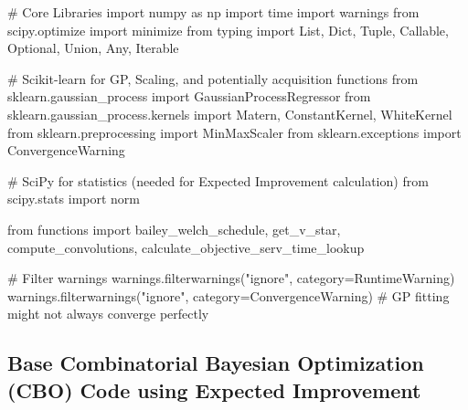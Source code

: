 \documentclass[
  letterpaper,
  DIV=11,
  numbers=noendperiod]{scrartcl}
\newenvironment{Shaded}{\begin{snugshade}}{\end{snugshade}}
\newcommand{\CommentTok}[1]{\textcolor[rgb]{0.37,0.37,0.37}{#1}}
\newcommand{\ImportTok}[1]{\textcolor[rgb]{0.00,0.46,0.62}{#1}}
\newcommand{\NormalTok}[1]{\textcolor[rgb]{0.00,0.23,0.31}{#1}}
\newcommand{\OperatorTok}[1]{\textcolor[rgb]{0.37,0.37,0.37}{#1}}
\newcommand{\PreprocessorTok}[1]{\textcolor[rgb]{0.68,0.00,0.00}{#1}}
\newcommand{\StringTok}[1]{\textcolor[rgb]{0.13,0.47,0.30}{#1}}
\begin{document}
\begin{Shaded}
\begin{Highlighting}[]
\CommentTok{\# Core Libraries}
\ImportTok{import}\NormalTok{ numpy }\ImportTok{as}\NormalTok{ np}
\ImportTok{import}\NormalTok{ time}
\ImportTok{import}\NormalTok{ warnings}
\ImportTok{from}\NormalTok{ scipy.optimize }\ImportTok{import}\NormalTok{ minimize}
\ImportTok{from}\NormalTok{ typing }\ImportTok{import}\NormalTok{ List, Dict, Tuple, Callable, Optional, Union, Any, Iterable}

\CommentTok{\# Scikit{-}learn for GP, Scaling, and potentially acquisition functions}
\ImportTok{from}\NormalTok{ sklearn.gaussian\_process }\ImportTok{import}\NormalTok{ GaussianProcessRegressor}
\ImportTok{from}\NormalTok{ sklearn.gaussian\_process.kernels }\ImportTok{import}\NormalTok{ Matern, ConstantKernel, WhiteKernel}
\ImportTok{from}\NormalTok{ sklearn.preprocessing }\ImportTok{import}\NormalTok{ MinMaxScaler}
\ImportTok{from}\NormalTok{ sklearn.exceptions }\ImportTok{import}\NormalTok{ ConvergenceWarning}

\CommentTok{\# SciPy for statistics (needed for Expected Improvement calculation)}
\ImportTok{from}\NormalTok{ scipy.stats }\ImportTok{import}\NormalTok{ norm}

\ImportTok{from}\NormalTok{ functions }\ImportTok{import}\NormalTok{ bailey\_welch\_schedule, get\_v\_star, compute\_convolutions, calculate\_objective\_serv\_time\_lookup}

\CommentTok{\# Filter warnings}
\NormalTok{warnings.filterwarnings(}\StringTok{"ignore"}\NormalTok{, category}\OperatorTok{=}\PreprocessorTok{RuntimeWarning}\NormalTok{)}
\NormalTok{warnings.filterwarnings(}\StringTok{"ignore"}\NormalTok{, category}\OperatorTok{=}\NormalTok{ConvergenceWarning) }\CommentTok{\# GP fitting might not always converge perfectly}
\end{Highlighting}
\end{Shaded}

\subsection{Base Combinatorial Bayesian Optimization (CBO) Code using
Expected
Improvement}\label{base-combinatorial-bayesian-optimization-cbo-code-using-expected-improvement}
\end{document}
